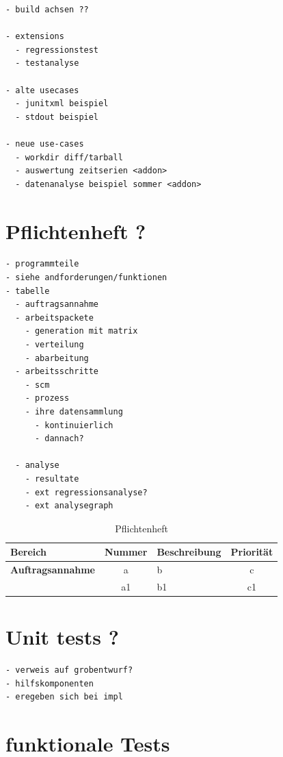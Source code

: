 \begin{verbatim}
- build achsen ??

- extensions
  - regressionstest
  - testanalyse

- alte usecases
  - junitxml beispiel
  - stdout beispiel

- neue use-cases
  - workdir diff/tarball
  - auswertung zeitserien <addon>
  - datenanalyse beispiel sommer <addon>
\end{verbatim}

\section{Pflichtenheft ?}

\begin{verbatim}
- programmteile
- siehe andforderungen/funktionen
- tabelle
  - auftragsannahme
  - arbeitspackete
    - generation mit matrix
    - verteilung
    - abarbeitung
  - arbeitsschritte
    - scm
    - prozess
    - ihre datensammlung
      - kontinuierlich
      - dannach?

  - analyse
    - resultate
    - ext regressionsanalyse?
    - ext analysegraph
\end{verbatim}



\begin{table}
\begin{tabular}{l || c | l | c}
    \textbf{Bereich} &
    \textbf{Nummer} &
    \textbf{Beschreibung} &
    \textbf{Priorit\"at} \\

    \hline
    \textbf{Auftragsannahme} &
      a & b & c \\
    & a1 & b1 & c1 \\
\end{tabular}

 \caption{Pflichtenheft}
  \label{tab:pflichtenheft}
\end{table}


\section{Unit tests ?}


\begin{verbatim}
- verweis auf grobentwurf?
- hilfskomponenten
- eregeben sich bei impl
\end{verbatim}

\section{funktionale Tests}

